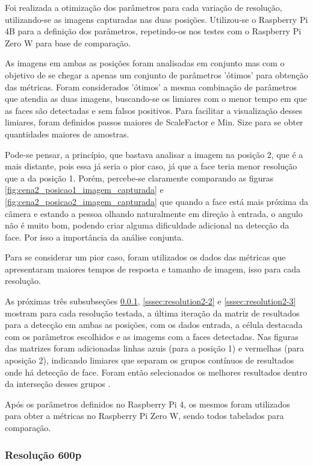Foi realizada a otimização dos parâmetros para cada variação de resolução, utilizando-se as imagens capturadas nas duas posições. Utilizou-se o Raspberry Pi 4B para a definição dos parâmetros, repetindo-os nos testes com o Raspberry Pi Zero W para base de comparação.

As imagens em ambas as posições foram analisadas em conjunto mas com o objetivo de se chegar a apenas um conjunto de parâmetros 'ótimos' para obtenção das métricas. Foram considerados 'ótimos' a mesma combinação de parâmetros que atendia as duas imagens, buscando-se os limiares com o menor tempo em que as faces são detectadas e sem falsos positivos. Para facilitar a visualização desses limiares, foram definidos passos maiores de ScaleFactor e Min. Size para se obter quantidades maiores de amostras.

Pode-se pensar, a princípio, que bastava analisar a imagem na posição 2, que é a mais distante, pois essa já seria o pior caso, já que a face teria menor resolução que a da posição 1. Porém, percebe-se claramente comparando as figuras \ref{fig:cena2_posicao1_imagem_capturada} e \ref{fig:cena2_posicao2_imagem_capturada} que quando a face está mais próxima da câmera e estando a pessoa olhando naturalmente em direção à entrada, o angulo não é muito bom, podendo criar alguma dificuldade adicional na detecção da face. Por isso a importância da análise conjunta.

Para se considerar um pior caso, foram utilizados os dados das métricas que apresentaram maiores tempos de resposta e tamanho de imagem, isso para cada resolução.

As próximas três subsubseções \ref{sssec:resolution2-1}, \ref{sssec:resolution2-2} e \ref{sssec:resolution2-3} mostram para cada resolução testada, a última iteração da matriz de resultados para a detecção em ambas as posições, com os dados entrada, a célula destacada com os parâmetros escolhidos e as imagems com a faces detectadas. Nas figuras das matrizes foram adicionadas linhas azuis (para a posição 1) e vermelhas (para aposição 2), indicando limiares que separam os grupos contínuos de resultados onde há detecção de face. Foram então selecionados os melhores resultados dentro da interseção desses grupos .

Após os parâmetros definidos no Raspberry Pi 4, os mesmos foram utilizados para obter a métricas no Raspberry Pi Zero W, sendo todos tabelados para comparação.


\subsubsection{Resolução 600p} \label{sssec:resolution2-1}

